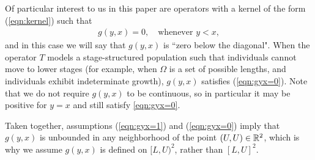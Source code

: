 Of particular interest to us in this paper are operators with a kernel of the form (\ref{eqn:kernel}) such that
\begin{align}
	g(y,x) = 0, \quad \text{whenever } y < x, \label{eqn:gyx=0}
\end{align} 
and in this case we will say that $g(y,x)$ is ``zero below the diagonal". When the operator $T$ models a stage-structured population such that individuals cannot move to lower stages (for example, when $\Omega$ is a set of possible lengths, and individuals exhibit indeterminate growth), $g(y,x)$ satisfies (\ref{eqn:gyx=0}). Note that we do not require $g(y, x)$ to be continuous, so in particular it may be positive for $y=x$ and still satisfy \eqref{eqn:gyx=0}.

Taken together, assumptions (\ref{eqn:gyx=1}) and (\ref{eqn:gyx=0}) imply that $g(y,x)$ is unbounded in any neighborhood of the point $(U, U) \in \mathbb{R}^2$, which is why we assume $g(y,x)$ is defined on $[L,U)^2$, rather than $[L,U]^2$. 

